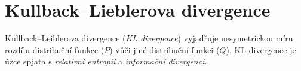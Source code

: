 \section{Kullback–Lieblerova divergence}
\label{sec:kl_divergence}

Kullback–Leiblerova divergence (\emph{KL divergence}) vyjadřuje nesymetrickou míru rozdílu distribuční funkce ($P$) vůči jiné distribuční funkci ($Q$).
KL divergence je úzce spjata s \emph{relativní entropií} a \emph{informační divergencí}.
